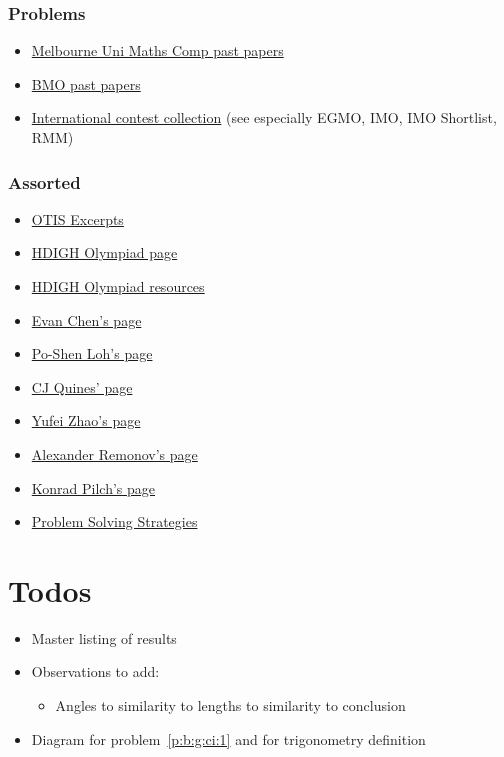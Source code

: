 \documentclass{amsart}
\begin{document}
\section{Problems}
\begin{itemize}
  \item \href{https://mathscomp.ms.unimelb.edu.au/past-papers/} {Melbourne Uni
      Maths Comp past papers}
  \item \href{https://www.bmoc.maths.org/home/bmolot.pdf} {BMO past papers}
  \item 
    \href{https://artofproblemsolving.com/community/c14_international_contests}
    {International contest collection}
    (see especially EGMO, IMO,  IMO Shortlist, RMM)
\end{itemize}

\section{Assorted}
\begin{itemize}
  \item \href{https://web.evanchen.cc/textbooks/OTIS-Excerpts.pdf}{OTIS
      Excerpts}
  \item \href{https://how-did-i-get-here.com/olympiad/}{HDIGH Olympiad page}
  \item \href{https://how-did-i-get-here.com/olympiad-resources/}{HDIGH Olympiad
      resources}
  \item \href{https://web.evanchen.cc/olympiad.html}{Evan Chen's page}
  \item \href{https://www.math.cmu.edu/~ploh/olympiad.shtml}{Po-Shen Loh's page}
  \item \href{https://cjquines.com/math/competition-handouts}{CJ Quines' page}
  \item \href{https://yufeizhao.com/olympiad/}{Yufei Zhao's page}
  \item \href{https://alexanderrem.weebly.com/math-competitions.html}{Alexander
      Remonov's page}
  \item \href{https://www.its.caltech.edu/~kpilch/olympiad.html}{Konrad Pilch's
      page}
  \item
    \href{https://archive.org/download/ProblemSolvingStrategies/Problem\%20Solving\%20Strategies.pdf}
    {Problem Solving Strategies}
\end{itemize}

\part*{Todos}
\begin{itemize}
  \item Master listing of results
  \item Observations to add:
    \begin{itemize}
      \item Angles to similarity to lengths to similarity to conclusion
    \end{itemize}
  \item Diagram for problem~\ref{p:b:g:ci:1} and for trigonometry definition
\end{itemize}
\end{document}
